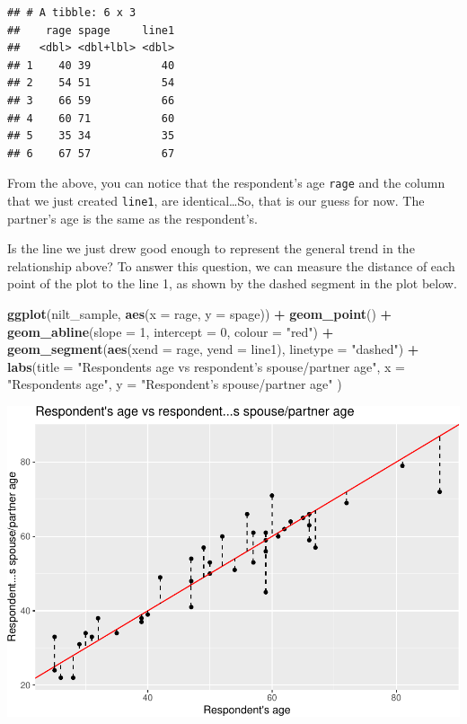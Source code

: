 \documentclass[
]{book}
\newenvironment{Shaded}{\begin{snugshade}}{\end{snugshade}}
\newcommand{\AttributeTok}[1]{\textcolor[rgb]{0.13,0.29,0.53}{#1}}
\newcommand{\DecValTok}[1]{\textcolor[rgb]{0.00,0.00,0.81}{#1}}
\newcommand{\FunctionTok}[1]{\textcolor[rgb]{0.13,0.29,0.53}{\textbf{#1}}}
\newcommand{\NormalTok}[1]{#1}
\newcommand{\SpecialCharTok}[1]{\textcolor[rgb]{0.81,0.36,0.00}{\textbf{#1}}}
\newcommand{\StringTok}[1]{\textcolor[rgb]{0.31,0.60,0.02}{#1}}
\begin{document}
\begin{verbatim}
## # A tibble: 6 x 3
##    rage spage     line1
##   <dbl> <dbl+lbl> <dbl>
## 1    40 39           40
## 2    54 51           54
## 3    66 59           66
## 4    60 71           60
## 5    35 34           35
## 6    67 57           67
\end{verbatim}

From the above, you can notice that the respondent's age \texttt{rage} and the column that we just created \texttt{line1}, are identical\ldots So, that is our guess for now. The partner's age is the same as the respondent's.

Is the line we just drew good enough to represent the general trend in the relationship above? To answer this question, we can measure the distance of each point of the plot to the line 1, as shown by the dashed segment in the plot below.

\begin{Shaded}
\begin{Highlighting}[]
\FunctionTok{ggplot}\NormalTok{(nilt\_sample, }\FunctionTok{aes}\NormalTok{(}\AttributeTok{x =}\NormalTok{ rage, }\AttributeTok{y =}\NormalTok{ spage)) }\SpecialCharTok{+} 
  \FunctionTok{geom\_point}\NormalTok{() }\SpecialCharTok{+}
  \FunctionTok{geom\_abline}\NormalTok{(}\AttributeTok{slope =} \DecValTok{1}\NormalTok{, }\AttributeTok{intercept =} \DecValTok{0}\NormalTok{, }\AttributeTok{colour =} \StringTok{"red"}\NormalTok{) }\SpecialCharTok{+}
  \FunctionTok{geom\_segment}\NormalTok{(}\FunctionTok{aes}\NormalTok{(}\AttributeTok{xend =}\NormalTok{ rage, }\AttributeTok{yend =}\NormalTok{ line1), }\AttributeTok{linetype =} \StringTok{"dashed"}\NormalTok{) }\SpecialCharTok{+}
   \FunctionTok{labs}\NormalTok{(}\AttributeTok{title =} \StringTok{"Respondent\textquotesingle{}s age vs respondent’s spouse/partner age"}\NormalTok{, }
       \AttributeTok{x =} \StringTok{"Respondent\textquotesingle{}s age"}\NormalTok{, }\AttributeTok{y =} \StringTok{"Respondent’s spouse/partner age"}\NormalTok{ )}
\end{Highlighting}
\end{Shaded}

\begin{flushleft}\includegraphics[width=1\linewidth]{lab-workbook_files/figure-latex/unnamed-chunk-88-1} \end{flushleft}
\end{document}
